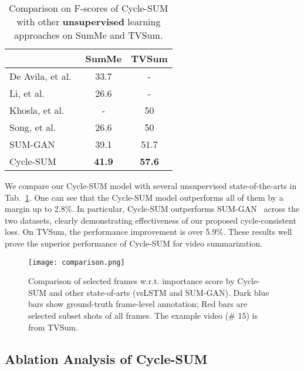 \documentclass[letterpaper]{article} \usepackage{aaai19}  \usepackage{times}  \usepackage{helvet}  \usepackage{courier}  \usepackage{url}  \usepackage{graphicx}  \frenchspacing  \setlength{\pdfpagewidth}{8.5in}  \setlength{\pdfpageheight}{11in}  \usepackage{amsmath}
\begin{document}
\begin{table}
\setlength{\belowcaptionskip}{1pt}
\begin{center}
\fontsize{8pt}{12pt}\selectfont
\caption{ Comparison on F-scores of Cycle-SUM with other \textbf{unsupervised} learning approaches on SumMe and TVSum.}
\begin{tabular}{l|c|c}
\toprule
 & SumMe &TVSum \\
 \midrule
 De Avila, et al.~\cite{de2011vsumm}   & 33.7    & -  \\
 Li, et al. ~\cite{li2010multi}&   26.6  & - \\
 Khosla, et al. ~\cite{khosla2013large} &- & 50\\
 Song, et al. ~\cite{song2015tvsum}&   26.6  & 50\\
 SUM-GAN~\cite{mahasseni2017unsupervised}& 39.1  & 51.7  \\
 {Cycle-SUM}& \textbf{41.9}  & \textbf{57.6} \\
 \bottomrule
\end{tabular}
\label{tab:unsupervised}
\end{center}
\end{table}



We compare our Cycle-SUM model with several unsupervised state-of-the-arts in
Tab.~\ref{tab:unsupervised}. One can see that the Cycle-SUM model outperforms all of them by a margin up to 2.8\%. In particular,  Cycle-SUM  outperforms SUM-GAN~\cite{mahasseni2017unsupervised} across the two datasets, clearly demonstrating effectiveness of our proposed cycle-consistent loss.  On TVSum, the performance improvement is over 5.9\%. These results well prove the superior performance of Cycle-SUM for video summarization.

\begin{figure*}[!tp]
\centering
\texttt{[image: comparison.png]}
\caption{\footnotesize Comparison of selected frames w.r.t. importance score by Cycle-SUM and other state-of-arts (vsLSTM and SUM-GAN). Dark blue bars show ground-truth frame-level annotation; Red bars are selected subset shots of all frames. The example video (\# 15) is from TVSum. }
\label{fig:compare_sota}
\end{figure*}

\subsection{Ablation Analysis of Cycle-SUM}
\end{document}
